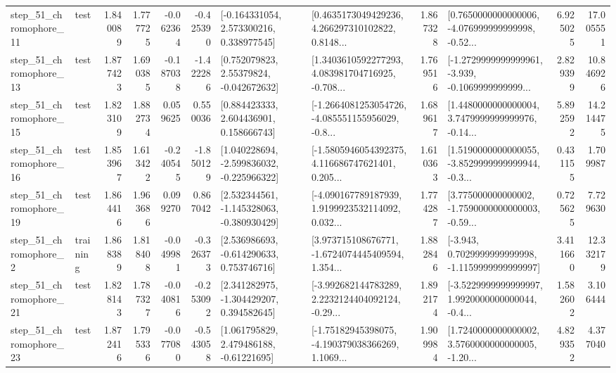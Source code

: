 \begin{tabular}{llrrrrllrlrr}
   step\_51\_chromophore\_11 &      test &      1.840089 &    1.777725 &     -0.062364 & -0.425390 &    [-0.164331054, 2.573300216, 0.338977545] &  [0.4635173049429236, 4.266297310102822, 0.8148... &       1.867328 &  [0.7650000000000006, -4.076999999999998, -0.52... &            6.925025 &         17.005551 \\
   step\_51\_chromophore\_13 &      test &      1.877423 &    1.690385 &     -0.187038 & -1.422286 &     [0.752079823, 2.55379824, -0.042672632] &  [1.3403610592277293, 4.083981704716925, -0.708... &       1.769516 &  [-1.2729999999999961, -3.939, -0.1069999999999... &            2.829399 &         10.846926 \\
   step\_51\_chromophore\_15 &      test &      1.823109 &    1.882734 &      0.059625 &  0.550036 &     [0.884423333, 2.604436901, 0.158666743] &  [-1.2664081253054726, -4.085551155956029, -0.8... &       1.689617 &  [1.4480000000000004, 3.7479999999999976, -0.14... &            5.892592 &         14.214475 \\
   step\_51\_chromophore\_16 &      test &      1.853967 &    1.613422 &     -0.240545 & -1.850129 &   [1.040228694, -2.599836032, -0.225966322] &  [-1.5805946054392375, 4.116686747621401, 0.205... &       1.610363 &  [1.5190000000000055, -3.8529999999999944, -0.3... &            0.431155 &          1.709987 \\
   step\_51\_chromophore\_19 &      test &      1.864416 &    1.963686 &      0.099270 &  0.867042 &   [2.532344561, -1.145328063, -0.380930429] &  [-4.090167789187939, 1.9199923532114092, 0.032... &       1.774287 &  [3.775000000000002, -1.7590000000000003, -0.59... &            0.725625 &          7.729630 \\
    step\_51\_chromophore\_2 &  training &      1.868389 &    1.818408 &     -0.049981 & -0.326373 &    [2.536986693, -0.614290633, 0.753746716] &  [3.973715108676771, -1.6724074445409594, 1.354... &       1.882846 &  [-3.943, 0.7029999999999998, -1.1159999999999997] &            3.411660 &         12.332179 \\
   step\_51\_chromophore\_21 &      test &      1.828143 &    1.787327 &     -0.040816 & -0.253092 &    [2.341282975, -1.304429207, 0.394582645] &  [-3.992682144783289, 2.2232124404092124, -0.29... &       1.892174 &  [-3.5229999999999997, 1.9920000000000044, -0.4... &            1.582602 &          3.106444 \\
   step\_51\_chromophore\_23 &      test &      1.872416 &    1.795336 &     -0.077080 & -0.543058 &     [1.061795829, 2.479486188, -0.61221695] &  [-1.75182945398075, -4.190379038366269, 1.1069... &       1.909984 &  [1.7240000000000002, 3.5760000000000005, -1.20... &            4.829352 &          4.377040 \\

\end{tabular}
